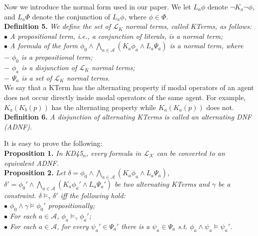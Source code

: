 \documentclass{llncs}
\begin{document}
Now we introduce the normal form used in our paper. We let $L_a\phi$ denote $\lnot K_a\lnot\phi$, and $L_a\Phi$ denote the conjunction of $L_a\phi$, where $\phi\in\Phi$.\vspace{0.05in}\\
\textbf{Definition 5.} \textit{We define the set of $\mathcal{L}_{K}$ normal terms, called KTerms, as follows:\\
    \hspace*{0.1in}$\bullet$ A propositional term, i.e., a conjunction of literals, is a normal term;\\
    \hspace*{0.1in}$\bullet$ A formula of the form $\phi_0\land\bigwedge_{a\in\mathcal{A}}(K_a\phi_a\land L_a\Psi_a)$ is a normal term, where\\
    \hspace*{0.1in}\hspace{0.1in} $-$ $\phi_0$ is a propositional term;\\
    \hspace*{0.1in}\hspace{0.1in} $-$ $\phi_a$ is a disjunction of $\mathcal{L}_{K}$ normal terms; \\
    \hspace*{0.1in}\hspace{0.1in} $-$ $\Psi_a$ is a set of $\mathcal{L}_{K}$ normal terms.} \vspace{0.05in}\\
We say that a KTerm has the alternating property if modal operators of an agent does not occur directly inside modal operators of the same agent. For example, $K_a(K_b(p))$ has the alternating property while $K_a(K_a(p))$ does not. %
\vspace{0.05in}\\
\textbf{Definition 6.} \textit{A disjunction of alternating KTerms is called an alternating DNF (ADNF).}

It is easy to prove the following:
\vspace{0.05in}\\
\textbf{Proposition 1.}
\textit{In KD45$_n$, every formula in $\mathcal{L}_\mathcal{K}$ can be converted to an equivalent ADNF.}\vspace{0.05in}\\
\textbf{Proposition 2.} \textit{Let $\delta=\phi_0\land\bigwedge_{a\in\mathcal{A}}(K_a\phi_a\land L_a\Psi_a)$,  $\delta'=\phi_0'\land\bigwedge_{a\in\mathcal{A}}(K_a\phi_a'\land L_a\Psi_a')$ be two alternating KTerms and $\gamma$ be a constraint. $\delta\models_\gamma\delta'$ iff the following hold:\\
\hspace*{0.1in}$\bullet$ $\phi_0\land\gamma\models\phi_0'$ propositionally;\\
\hspace*{0.1in}$\bullet$ For each $a\in\mathcal{A}$, $\phi_a\models_\gamma\phi_a'$;\\
\hspace*{0.1in}$\bullet$ For each $a\in\mathcal{A}$, for every $\psi_a'\in\Psi_a'$ there is a $\psi_a\in\Psi_a$ s.t. $\phi_a\land\psi_a\models\psi_a'$.}\vspace{0.05in}
\end{document}
